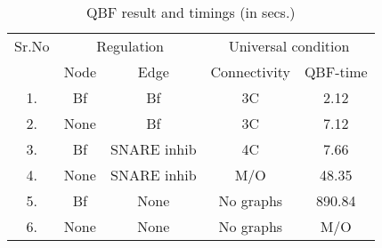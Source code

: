 \begin{table}[t]
	\centering
	    \def\arraystretch{1.2}
		\begin{tabular}[t]{ c|c c|c|c }\hline
			
			{\multirow{2}{*} {Sr.No}}  & \multicolumn{2}{c|}{Regulation} & \multicolumn{2}{c}{Universal condition} 
			
			

			
			\\
			\cline{2-5}
			{} & {Node} & {Edge} & {Connectivity} &  {QBF-time}
			
			\\\hline
			1. & Bf & Bf & 3C & 2.12   \\\hline
			2. & None & Bf  & 3C & 7.12  \\\hline
			3. & Bf & SNARE inhib & 4C  & 7.66 \\\hline
			4. & None & SNARE inhib   & M/O & 48.35 \\\hline
			5. & Bf & None  & No graphs  & 890.84 \\\hline
			6. &  None & None  & No graphs  & M/O \\\hline
			
	\end{tabular}
	\caption{ QBF result and timings (in secs.)}
	\label{tab:qbf-graph}
\end{table}